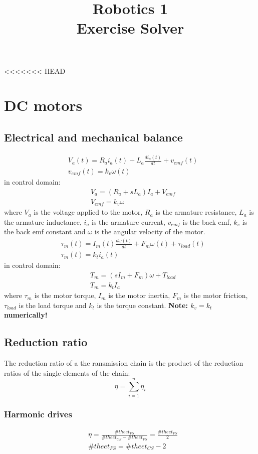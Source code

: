 \documentclass[11pt]{article}
\begin{document}
\title{Robotics 1 \\ Exercise Solver}
\maketitle
\tableofcontents
<<<<<<< HEAD
\section{DC motors}\label{sec:dc_motors}
\subsection{Electrical and mechanical balance}
\begin{align}
&V_a(t) = R_ai_a(t) + L_a\frac{di_a(t)}{dt} + v_{emf}(t)\\
&v_{emf}(t) = k_v\omega(t)
\end{align}
in control domain:
\begin{align}
 &V_a= (R_a + sL_a)I_a+ V_{emf}\\
    &V_{emf} = k_v\omega
\end{align}
where $V_a$ is the voltage applied to the motor, $R_a$ is the armature 
resistance, $L_a$ is the armature inductance, $i_a$ is the armature 
current, $v_{emf}$ is the back emf, $k_v$ is the back emf constant
 and $\omega$ is the angular velocity of the motor.
\begin{align}
    &\tau_m(t) = I_m(t)\frac{d\omega(t)}{dt} + F_m\omega(t)+ \tau_{load}(t)\\
    &\tau_m(t) = k_t i_a(t)
\end{align}
in control domain:
\begin{align}
    &T_m= (sI_m + F_m)\omega + T_{load}\\
    &T_m = k_t I_a
\end{align}
where $\tau_m$ is the motor torque, $I_m$ is the motor inertia,
 $F_m$ is the motor friction, $\tau_{load}$ is the load torque
  and $k_t$ is the torque constant.
\textbf{Note: $k_v = k_t$ numerically!}
\subsection{Reduction ratio}
The reduction ratio of a the ransmission chain is the product of the
 reduction ratios of the single elements of the chain:
\begin{equation}
    \eta = \sum_{i=1}^n \eta_i
\end{equation}
\subsubsection{Harmonic drives}
\begin{align}
    &\eta  = \frac{\#theet_{FS}}{\#theet_{CS}-\#theet_{FS}} = \frac{\#theet_{FS}}{2}\\
    &\#theet_{FS} = \#theet_{CS} - 2
\end{align}
\end{document}
